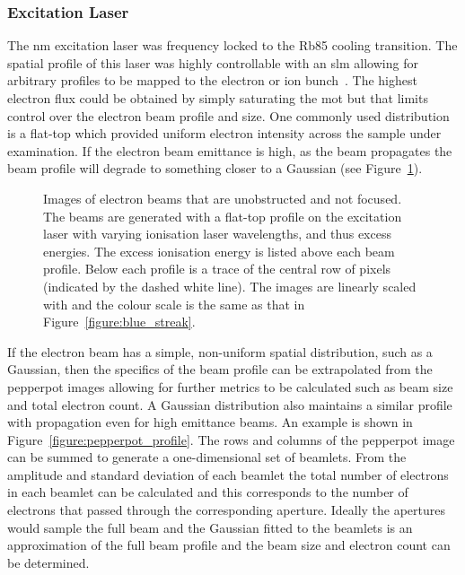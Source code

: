 \subsubsection{Excitation Laser}
The \unit[780]{nm} excitation laser was frequency locked to the Rb85 cooling transition.
The spatial profile of this laser was highly controllable with an \gls{slm} allowing for arbitrary profiles to be mapped to the electron or ion bunch~\cite{mcculloch_arbitrarily_2011}.
The highest electron flux could be obtained by simply saturating the \gls{mot} but that limits control over the electron beam profile and size.
One commonly used distribution is a flat-top which provided uniform electron intensity across the sample under examination.
If the electron beam emittance is high, as the beam propagates the beam profile will degrade to something closer to a Gaussian (see Figure~\ref{figure:flat_top}).

\begin{figure}
    \center
    
    \caption[Blurring of flat-top electron profile with emittance.]{Images of electron beams that are unobstructed and not focused. The beams are generated with a flat-top profile on the excitation laser with varying ionisation laser wavelengths, and thus excess energies. The excess ionisation energy is listed above each beam profile. Below each profile is a trace of the central row of pixels (indicated by the dashed white line). The images are linearly scaled with and the colour scale is the same as that in Figure~\ref{figure:blue_streak}.}
    \label{figure:flat_top}
\end{figure}

If the electron beam has a simple, non-uniform spatial distribution, such as a Gaussian, then the specifics of the beam profile can be extrapolated from the pepperpot images allowing for further metrics to be calculated such as beam size and total electron count.
A Gaussian distribution also maintains a similar profile with propagation even for high emittance beams.
An example is shown in Figure~\ref{figure:pepperpot_profile}.
The rows and columns of the pepperpot image can be summed to generate a one-dimensional set of beamlets.
From the amplitude and standard deviation of each beamlet the total number of electrons in each beamlet can be calculated and this corresponds to the number of electrons that passed through the corresponding aperture.
Ideally the apertures would sample the full beam and the Gaussian fitted to the beamlets is an approximation of the full beam profile and the beam size and electron count can be determined.

